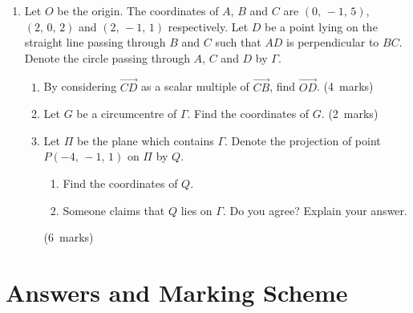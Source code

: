 \documentclass[12pt, a4paper]{article} %
\newcommand{\qmarks}[1]{\leavevmode\unskip\hspace*{\fill}\mbox{(#1 marks)}}
\begin{document}
\begin{enumerate}
    \item Let \(O\) be the origin. The coordinates of \(A\), \(B\) and \(C\) are \((0,\,-1,\,5)\), \((2,\,0,\,2)\) and \((2,\,-1,\,1)\) respectively. Let \(D\) be a point lying on the straight line passing through \(B\) and \(C\) such that \(AD\) is perpendicular to \(BC\). Denote the circle passing through \(A\), \(C\) and \(D\) by \(\varGamma\).
    \begin{enumerate}
        \item By considering \(\overrightarrow{CD}\) as a scalar multiple of \(\overrightarrow{CB}\), find \(\overrightarrow{OD}\). \qmarks{4}
        \item Let \(G\) be a circumcentre of \(\varGamma\). Find the coordinates of \(G\). \qmarks{2}
        \item Let \(\varPi\) be the plane which contains \(\varGamma\). Denote the projection of point \(P(-4,\,-1,\,1)\) on \(\varPi\) by \(Q\).
        \begin{enumerate}[label=(\roman*)]
            \item Find the coordinates of \(Q\).
            \item Someone claims that \(Q\) lies on \(\varGamma\). Do you agree? Explain your answer.
        \end{enumerate}\qmarks{6}
    \end{enumerate}

    
\end{enumerate}

\newpage

\part{Answers and Marking Scheme}
\end{document}
